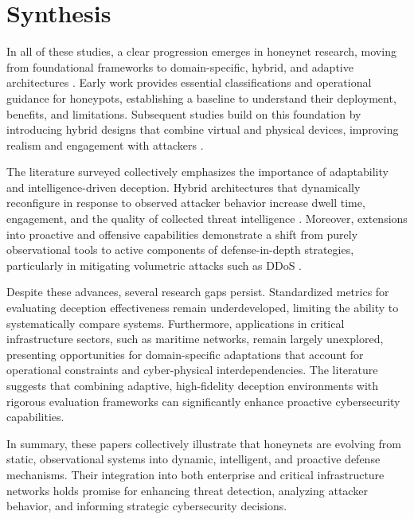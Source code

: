 \documentclass[12pt]{article}
\begin{document}
\section{Synthesis}
In all of these studies, a clear progression emerges in honeynet research, moving from foundational frameworks to domain-specific, hybrid, and adaptive architectures \cite{mokube2007honeypots}. Early work provides essential classifications and operational guidance for honeypots, establishing a baseline to understand their deployment, benefits, and limitations. Subsequent studies build on this foundation by introducing hybrid designs \cite{zheng2022honeynet} that combine virtual and physical devices, improving realism and engagement with attackers \cite{javadpour2024comprehensive}.

The literature surveyed collectively emphasizes the importance of adaptability and intelligence-driven deception. Hybrid architectures that dynamically reconfigure in response to observed attacker behavior increase dwell time, engagement, and the quality of collected threat intelligence \cite{evan2025implementation}. Moreover, extensions into proactive and offensive capabilities demonstrate a shift from purely observational tools to active components of defense-in-depth strategies, particularly in mitigating volumetric attacks such as DDoS \cite{patil2025ddos}. 

Despite these advances, several research gaps persist. Standardized metrics for evaluating deception effectiveness remain underdeveloped, limiting the ability to systematically compare systems. Furthermore, applications in critical infrastructure sectors, such as maritime networks, remain largely unexplored, presenting opportunities for domain-specific adaptations that account for operational constraints and cyber-physical interdependencies. The literature suggests that combining adaptive, high-fidelity deception environments with rigorous evaluation frameworks can significantly enhance proactive cybersecurity capabilities. 

In summary, these papers collectively illustrate that honeynets are evolving from static, observational systems into dynamic, intelligent, and proactive defense mechanisms. Their integration into both enterprise and critical infrastructure networks holds promise for enhancing threat detection, analyzing attacker behavior, and informing strategic cybersecurity decisions. 

\end{document}
